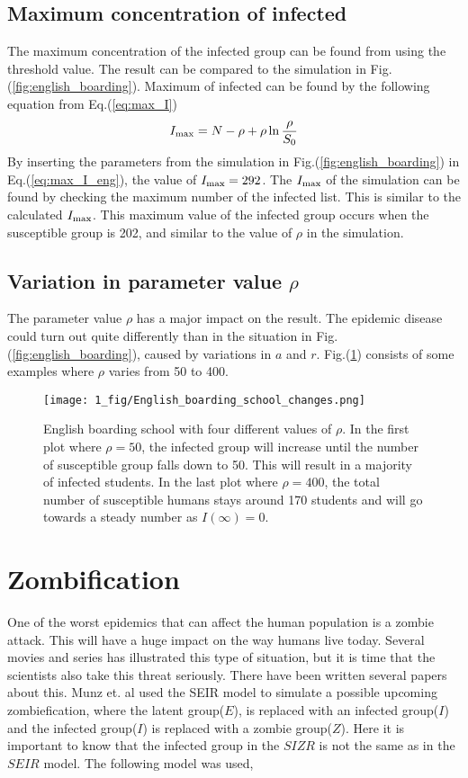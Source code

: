 \documentclass[%
twoside,                 %
final,                   %
chapterprefix=true,      %
open=right               %
10pt]{book}
\begin{document}
\subsection{Maximum concentration of infected}
The maximum concentration of the infected group can be found from using the threshold value. The result can be compared to the simulation in Fig.(\ref{fig:english_boarding}). Maximum of infected can be found by the following equation from Eq.(\ref{eq:max_I})
\begin{equation} \label{eq:max_I_eng}
I_{\textrm{max}}= N - \rho + \rho \ln\frac{\rho}{S_0} 
\end{equation}
By inserting the parameters from the simulation in Fig.(\ref{fig:english_boarding}) in Eq.(\ref{eq:max_I_eng}), the value of $I_{\textrm{max}} = 292$. The $I_{\textrm{max}}$ of the simulation can be found by checking the maximum number of the infected list. This is similar to the calculated $I_{\textrm{max}}$. This maximum value of the infected group occurs when the susceptible group is 202, and similar to the value of $\rho$ in the simulation.

\subsection{Variation in parameter value $\rho$}
The parameter value $\rho$ has a major impact on the result. The epidemic disease could turn out quite differently than in the situation in Fig.(\ref{fig:english_boarding}), caused by variations in $a$ and $r$. Fig.(\ref{fig:rho_changes}) consists of some examples where $\rho$ varies from 50 to 400.


\begin{figure}[ht]
  \centerline{\texttt{[image: 1\_fig/English\_boarding\_school\_changes.png]}}
  \caption{
  \label{fig:rho_changes} English boarding school with four different values of $\rho$. In the first plot where $\rho=50$, the infected group will increase until the number of susceptible group falls down to 50. This will result in a majority of infected students. In the last plot where $\rho=400$, the total number of susceptible humans stays around 170 students and will go towards a steady number as $I(\infty)=0$.
  }
\end{figure}


\section{Zombification}
\label{section:1_zombiefication}
One of the worst epidemics that can affect the human population is a zombie attack. This will have a huge impact on the way humans live today. Several movies and series has illustrated this type of situation, but it is time that the scientists also take this threat seriously. There have been written several papers about this. Munz et. al\cite{munz2009zombies} used the SEIR model to simulate a possible upcoming zombiefication, where the latent group($E$), is replaced with an infected group($I$) and the infected group($I$) is replaced with a zombie group($Z$). Here it is important to know that the infected group in the $SIZR$ is not the same as in the $SEIR$ model. The following model was used,
\end{document}
